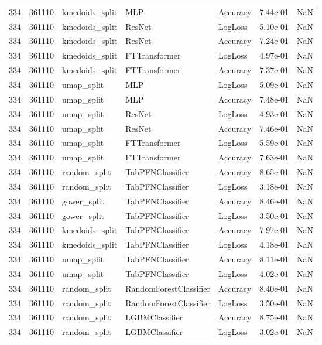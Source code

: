 \begin{tabular}{rrlllrr}
334 & 361110 & kmedoids\_split & MLP & Accuracy & 7.44e-01 & NaN \\
334 & 361110 & kmedoids\_split & ResNet & LogLoss & 5.10e-01 & NaN \\
334 & 361110 & kmedoids\_split & ResNet & Accuracy & 7.24e-01 & NaN \\
334 & 361110 & kmedoids\_split & FTTransformer & LogLoss & 4.97e-01 & NaN \\
334 & 361110 & kmedoids\_split & FTTransformer & Accuracy & 7.37e-01 & NaN \\
334 & 361110 & umap\_split & MLP & LogLoss & 5.09e-01 & NaN \\
334 & 361110 & umap\_split & MLP & Accuracy & 7.48e-01 & NaN \\
334 & 361110 & umap\_split & ResNet & LogLoss & 4.93e-01 & NaN \\
334 & 361110 & umap\_split & ResNet & Accuracy & 7.46e-01 & NaN \\
334 & 361110 & umap\_split & FTTransformer & LogLoss & 5.59e-01 & NaN \\
334 & 361110 & umap\_split & FTTransformer & Accuracy & 7.63e-01 & NaN \\
334 & 361110 & random\_split & TabPFNClassifier & Accuracy & 8.65e-01 & NaN \\
334 & 361110 & random\_split & TabPFNClassifier & LogLoss & 3.18e-01 & NaN \\
334 & 361110 & gower\_split & TabPFNClassifier & Accuracy & 8.46e-01 & NaN \\
334 & 361110 & gower\_split & TabPFNClassifier & LogLoss & 3.50e-01 & NaN \\
334 & 361110 & kmedoids\_split & TabPFNClassifier & Accuracy & 7.97e-01 & NaN \\
334 & 361110 & kmedoids\_split & TabPFNClassifier & LogLoss & 4.18e-01 & NaN \\
334 & 361110 & umap\_split & TabPFNClassifier & Accuracy & 8.11e-01 & NaN \\
334 & 361110 & umap\_split & TabPFNClassifier & LogLoss & 4.02e-01 & NaN \\
334 & 361110 & random\_split & RandomForestClassifier & Accuracy & 8.40e-01 & NaN \\
334 & 361110 & random\_split & RandomForestClassifier & LogLoss & 3.50e-01 & NaN \\
334 & 361110 & random\_split & LGBMClassifier & Accuracy & 8.75e-01 & NaN \\
334 & 361110 & random\_split & LGBMClassifier & LogLoss & 3.02e-01 & NaN \\

\end{tabular}
